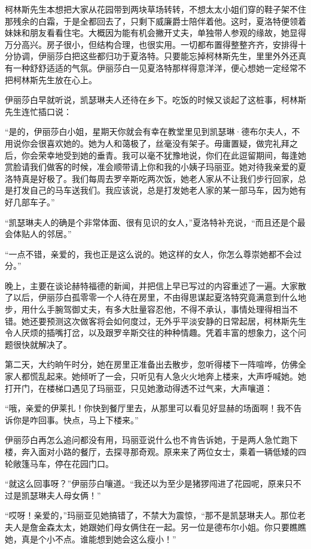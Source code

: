 \par 柯林斯先生本想把大家从花园带到两块草场转转，不想太太小姐们穿的鞋子架不住那残余的白霜，于是全都回去了，只剩下威廉爵士陪伴着他。这时，夏洛特便领着妹妹和朋友看看住宅。大概因为能有机会撇开丈夫，单独带人参观的缘故，她显得万分高兴。房子很小，但结构合理，也很实用。一切都布置得整整齐齐，安排得十分协调，伊丽莎白把这些都归功于夏洛特。只要能忘掉柯林斯先生，里里外外还真有一种舒舒适适的气氛。伊丽莎白一见夏洛特那样得意洋洋，便心想她一定经常不把柯林斯先生放在心上。
\par 伊丽莎白早就听说，凯瑟琳夫人还待在乡下。吃饭的时候又谈起了这桩事，柯林斯先生连忙插口说：
\par “是的，伊丽莎白小姐，星期天你就会有幸在教堂里见到凯瑟琳·德布尔夫人，不用说你会很喜欢她的。她为人和蔼极了，丝毫没有架子。毋庸置疑，做完礼拜之后，你会荣幸地受到她的垂青。我可以毫不犹豫地说，你们在此逗留期间，每逢她赏脸请我们做客的时候，准会顺带请上你和我的小姨子玛丽亚。她对待我亲爱的夏洛特真是好极了。我们每周去罗辛斯吃两次饭，她老人家从不让我们步行回家，总是打发自己的马车送我们。我应该说，总是打发她老人家的某一部马车，因为她有好几部车子。”
\par “凯瑟琳夫人的确是个非常体面、很有见识的女人，”夏洛特补充说，“而且还是个最会体贴人的邻居。”
\par “一点不错，亲爱的，我也正是这么说的。她这样的女人，你怎么尊崇她都不会过分。”
\par 晚上，主要在谈论赫特福德的新闻，并把信上早已写过的内容重述了一遍。大家散了以后，伊丽莎白孤零零一个人待在房里，不由得思谋起夏洛特究竟满意到什么地步，用什么手腕驾御丈夫，有多大肚量容忍他，不得不承认，事情处理得相当不错。她还要预测这次做客将会如何度过，无外乎平淡安静的日常起居，柯林斯先生令人厌烦的插嘴打岔，以及跟罗辛斯交往的种种情趣。凭着丰富的想象力，这个问题很快就解决了。
\par 第二天，大约晌午时分，她在房里正准备出去散步，忽听得楼下一阵喧哗，仿佛全家人都慌乱起来。她倾听了一会，只听见有人急火火地奔上楼来，大声呼喊她。她打开门，在楼梯口遇见了玛丽亚，只见她激动得透不过气来，大声嚷道：
\par “哦，亲爱的伊莱扎！你快到餐厅里去，从那里可以看见好显赫的场面啊！我不告诉你是咋回事。快点，马上下楼来。”
\par 伊丽莎白再怎么追问都没有用，玛丽亚说什么也不肯告诉她，于是两人急忙跑下楼，奔入面对小路的餐厅，去探寻那奇观。原来来了两位女士，乘着一辆低矮的四轮敞篷马车，停在花园门口。
\par “就这么回事呀？”伊丽莎白嚷道。“我还以为至少是猪猡闯进了花园呢，原来只不过是凯瑟琳夫人母女俩！”
\par “哎呀！亲爱的，”玛丽亚见她搞错了，不禁大为震惊，“那不是凯瑟琳夫人。那位老夫人是詹金森太太，她跟她们母女俩住在一起。另一位是德布尔小姐。你只要瞧瞧她，真是个小不点。谁能想到她会这么瘦小！”
